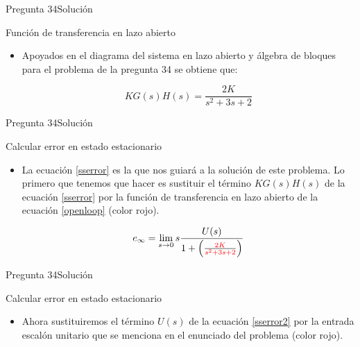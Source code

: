\documentclass[10pt]{beamer}
\begin{document}
{\begin{frame}{Pregunta 34}{Solución}
\begin{block}{Función de transferencia en lazo abierto}
  \medskip
  
  \begin{itemize}
    \item<1-> Apoyados en el diagrama del sistema en lazo abierto y álgebra de bloques para el problema de la pregunta 34 se obtiene que:
    
    \begin{equation}\label{openloop}
        KG(s)H(s) = \frac{2K}{s^2 + 3s + 2}
    \end{equation}
  \end{itemize}

\end{block}
\end{frame}


\begin{frame}{Pregunta 34}{Solución}
  
\begin{block}{Calcular error en estado estacionario}
  
  \begin{itemize}
    \item<1-> La ecuación \ref{sserror} es la que nos guiará a la solución de este problema. Lo primero que tenemos que hacer es sustituir el término $KG(s)H(s)$ de la ecuación \ref{sserror} por la función de transferencia en lazo abierto de la ecuación \ref{openloop} (color rojo).
    
    \begin{equation}\label{sserror2}
        e_{\infty} = \lim\limits_{s \to 0}s\frac{U(s)}{1+\left(\frac{\textcolor{red}{2K}}{\textcolor{red}{s^2 + 3s + 2}}\right)}
    \end{equation}
  \end{itemize}

\end{block}
\end{frame}

\begin{frame}{Pregunta 34}{Solución}
  
\begin{block}{Calcular error en estado estacionario}
  
  \begin{itemize}
    \item<1-> Ahora sustituiremos el término $U(s)$ de la ecuación \ref{sserror2} por la entrada escalón unitario que se menciona en el enunciado del problema (color rojo).
    

\end{itemize}
\end{block}
\end{frame}}
\end{document}
